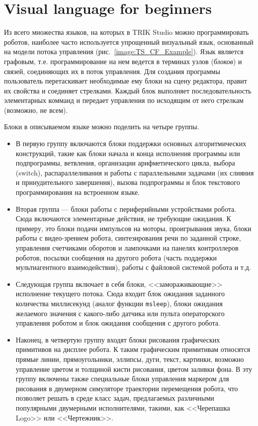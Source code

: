 \documentclass[conference]{IEEEtran}
\begin{document}
\section{Visual language for beginners}
\label{chapter:controlFlowLanguage}

Из всего множества языков, на которых в TRIK Studio можно программировать роботов, наиболее часто используется упрощенный визуальный язык, основанный на модели потока управления (рис.~\ref{image:TS_CF_Example}). Язык является графовым, т.е. программирование на нем ведется в терминах узлов (\textit{блоков}) и связей, соединяющих их в поток управления. Для создания программы пользователь перетаскивает необходимые ему блоки на сцену редактора, правит их свойства и соединяет стрелками. Каждый блок выполняет последовательность элементарных комманд и передает управления по исходящим от него стрелкам (возможно, не всем).

Блоки в описываемом языке можно поделить на четыре группы.
\begin{itemize}
    \item В первую группу включаются блоки поддержки основных алгоритмических конструкций, такие как блоки начала и конца исполнения программы или подпрограммы, ветвления, организации арифметического цикла, выбора (switch), распараллеливания и работы с параллельными задачами (их слияния и принудительного завершения), вызова подпрограммы и блок текстового программирования на встроенном языке.
    \item Вторая группа --- блоки работы с периферийными устройствами робота. Сюда включаются элементарные действия, не требующие ожидания. К примеру, это блоки подачи импульсов на моторы, проигрывания звука, блоки работы с видео-зрением робота, синтезирования речи по заданной строке, управления счетчиками оборотов и лампочками на панелях контроллеров роботов, посылки сообщения на другого робота (часть поддержки мультиагентного взаимодействия), работы с файловой системой робота и т.д.
    \item Следующая группа включает в себя блоки, <<замораживающие>> исполнение текущего потока. Сюда входит блок ожидания заданного количества миллисекунд (аналог функции \texttt{msleep}), блоки ожидания желаемого значения с какого-либо датчика или пульта операторского управления роботом и блок ожидания сообщения с другого робота.
    \item Наконец, в четвертую группу входят блоки рисования графических примитивов на дисплее робота. К таким графическим примитивам относятся прямые линии, прямоугольники, эллипсы, дуги, текст, картинки, возможно управление цветом и толщиной кисти рисования, цветом заливки фона. В эту группу включены также специальные блоки управления маркером для рисования в двумерном симуляторе траектории перемещения робота, что позволяет решать в среде класс задач, предлагаемых различными популярными двумерными исполнителями, такими, как <<Черепашка Logo>> или <<Чертежник>>.
\end{itemize}
\end{document}
